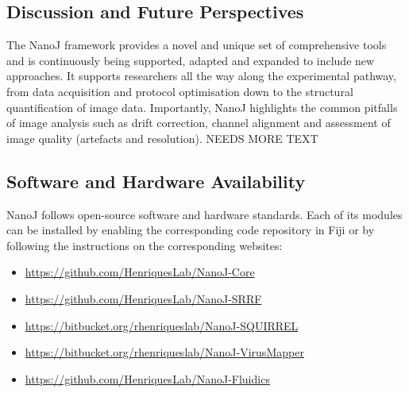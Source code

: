 \subsection*{Discussion and Future Perspectives}
 The NanoJ framework provides a novel and unique set of comprehensive tools and is continuously being supported, adapted and expanded to include new approaches. It supports researchers all the way along the experimental pathway, from data acquisition and protocol optimisation down to the structural quantification of image data. 
 Importantly, NanoJ highlights the common pitfalls of image analysis such as drift correction, channel alignment and assessment of image quality (artefacts and resolution). NEEDS MORE TEXT

\subsection*{Software and Hardware Availability}
 NanoJ follows open-source software and hardware standards. Each of its modules can be installed by enabling the corresponding code repository in Fiji or by following the instructions on the corresponding websites:
 \small
 \begin{itemize}
  \item \href{https://github.com/HenriquesLab/NanoJ-Core}{https://github.com/HenriquesLab/NanoJ-Core}
  \item \href{https://github.com/HenriquesLab/NanoJ-SRRF}{https://github.com/HenriquesLab/NanoJ-SRRF}
  \item \href{https://bitbucket.org/rhenriqueslab/nanoj-squirrel}{https://bitbucket.org/rhenriqueslab/NanoJ-SQUIRREL}
  \item \href{https://bitbucket.org/rhenriqueslab/NanoJ-VirusMapper}{https://bitbucket.org/rhenriqueslab/NanoJ-VirusMapper}
  \item \href{https://github.com/HenriquesLab/NanoJ-Fluidics}{https://github.com/HenriquesLab/NanoJ-Fluidics}
\end{itemize}




